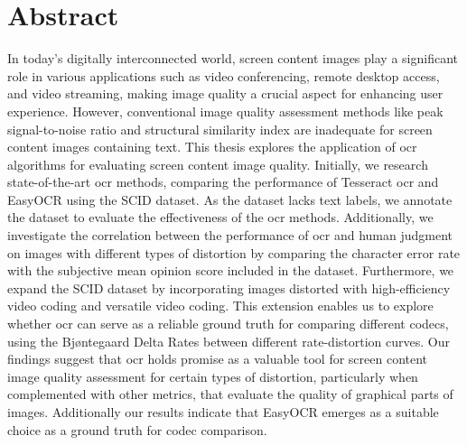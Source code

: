 \chapter{Abstract}

In today's digitally interconnected world, screen content images play a significant role in various applications such as video conferencing, remote desktop access, and video streaming, making image quality a crucial aspect for enhancing user experience.
However, conventional image quality assessment methods like peak signal-to-noise ratio and structural similarity index are inadequate for screen content images containing text.
This thesis explores the application of \gls{ocr} algorithms for evaluating screen content image quality.
Initially, we research state-of-the-art \gls{ocr} methods, comparing the performance of Tesseract \gls{ocr} and EasyOCR using the SCID dataset. 
As the dataset lacks text labels, we annotate the dataset to evaluate the effectiveness of the \gls{ocr} methods.
Additionally, we investigate the correlation between the performance of \gls{ocr} and human judgment on images with different types of distortion by comparing the character error rate with the subjective mean opinion score included in the dataset.
Furthermore, we expand the SCID dataset by incorporating images distorted with high-efficiency video coding and versatile video coding.
This extension enables us to explore whether \gls{ocr} can serve as a reliable ground truth for comparing different codecs, using the Bjøntegaard Delta Rates between different rate-distortion curves.
Our findings suggest that \gls{ocr} holds promise as a valuable tool for screen content image quality assessment for certain types of distortion, particularly when complemented with other metrics, that evaluate the quality of graphical parts of images.
Additionally our results indicate that EasyOCR emerges as a suitable choice as a ground truth for codec comparison.
